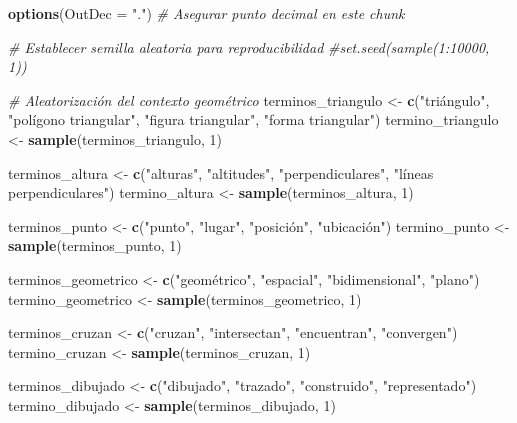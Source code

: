 \documentclass[
]{article}
\author{}
\date{\vspace{-2.5em}}
\newenvironment{Shaded}{\begin{snugshade}}{\end{snugshade}}
\newcommand{\AttributeTok}[1]{\textcolor[rgb]{0.13,0.29,0.53}{#1}}
\newcommand{\CommentTok}[1]{\textcolor[rgb]{0.56,0.35,0.01}{\textit{#1}}}
\newcommand{\DecValTok}[1]{\textcolor[rgb]{0.00,0.00,0.81}{#1}}
\newcommand{\FunctionTok}[1]{\textcolor[rgb]{0.13,0.29,0.53}{\textbf{#1}}}
\newcommand{\NormalTok}[1]{#1}
\newcommand{\OtherTok}[1]{\textcolor[rgb]{0.56,0.35,0.01}{#1}}
\newcommand{\StringTok}[1]{\textcolor[rgb]{0.31,0.60,0.02}{#1}}
\begin{document}
\begin{Shaded}
\begin{Highlighting}[]
\FunctionTok{options}\NormalTok{(}\AttributeTok{OutDec =} \StringTok{"."}\NormalTok{)  }\CommentTok{\# Asegurar punto decimal en este chunk}

\CommentTok{\# Establecer semilla aleatoria para reproducibilidad}
\CommentTok{\#set.seed(sample(1:10000, 1))}

\CommentTok{\# Aleatorización del contexto geométrico}
\NormalTok{terminos\_triangulo }\OtherTok{\textless{}{-}} \FunctionTok{c}\NormalTok{(}\StringTok{"triángulo"}\NormalTok{, }\StringTok{"polígono triangular"}\NormalTok{, }\StringTok{"figura triangular"}\NormalTok{, }\StringTok{"forma triangular"}\NormalTok{)}
\NormalTok{termino\_triangulo }\OtherTok{\textless{}{-}} \FunctionTok{sample}\NormalTok{(terminos\_triangulo, }\DecValTok{1}\NormalTok{)}

\NormalTok{terminos\_altura }\OtherTok{\textless{}{-}} \FunctionTok{c}\NormalTok{(}\StringTok{"alturas"}\NormalTok{, }\StringTok{"altitudes"}\NormalTok{, }\StringTok{"perpendiculares"}\NormalTok{, }\StringTok{"líneas perpendiculares"}\NormalTok{)}
\NormalTok{termino\_altura }\OtherTok{\textless{}{-}} \FunctionTok{sample}\NormalTok{(terminos\_altura, }\DecValTok{1}\NormalTok{)}

\NormalTok{terminos\_punto }\OtherTok{\textless{}{-}} \FunctionTok{c}\NormalTok{(}\StringTok{"punto"}\NormalTok{, }\StringTok{"lugar"}\NormalTok{, }\StringTok{"posición"}\NormalTok{, }\StringTok{"ubicación"}\NormalTok{)}
\NormalTok{termino\_punto }\OtherTok{\textless{}{-}} \FunctionTok{sample}\NormalTok{(terminos\_punto, }\DecValTok{1}\NormalTok{)}

\NormalTok{terminos\_geometrico }\OtherTok{\textless{}{-}} \FunctionTok{c}\NormalTok{(}\StringTok{"geométrico"}\NormalTok{, }\StringTok{"espacial"}\NormalTok{, }\StringTok{"bidimensional"}\NormalTok{, }\StringTok{"plano"}\NormalTok{)}
\NormalTok{termino\_geometrico }\OtherTok{\textless{}{-}} \FunctionTok{sample}\NormalTok{(terminos\_geometrico, }\DecValTok{1}\NormalTok{)}

\NormalTok{terminos\_cruzan }\OtherTok{\textless{}{-}} \FunctionTok{c}\NormalTok{(}\StringTok{"cruzan"}\NormalTok{, }\StringTok{"intersectan"}\NormalTok{, }\StringTok{"encuentran"}\NormalTok{, }\StringTok{"convergen"}\NormalTok{)}
\NormalTok{termino\_cruzan }\OtherTok{\textless{}{-}} \FunctionTok{sample}\NormalTok{(terminos\_cruzan, }\DecValTok{1}\NormalTok{)}

\NormalTok{terminos\_dibujado }\OtherTok{\textless{}{-}} \FunctionTok{c}\NormalTok{(}\StringTok{"dibujado"}\NormalTok{, }\StringTok{"trazado"}\NormalTok{, }\StringTok{"construido"}\NormalTok{, }\StringTok{"representado"}\NormalTok{)}
\NormalTok{termino\_dibujado }\OtherTok{\textless{}{-}} \FunctionTok{sample}\NormalTok{(terminos\_dibujado, }\DecValTok{1}\NormalTok{)}


\end{Highlighting}
\end{Shaded}
\end{document}
